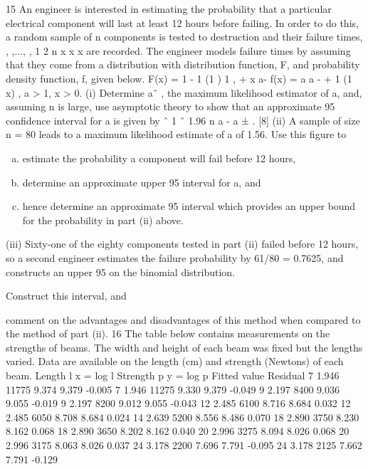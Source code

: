 \documentclass[a4paper,12pt]{article}
\begin{document}
15 An engineer is interested in estimating the probability that a particular
electrical component will last at least 12 hours before failing. In order to do
this, a random sample of n components is tested to destruction and their
failure times, , ,..., , 1 2 n x x x are recorded. The engineer models failure times by
assuming that they come from a distribution with distribution function, F, and
probability density function, f, given below.
F(x) = 1 - 1
(1 ) 1
,
+ x a- f(x) = a
a
-
+
1
(1 x)
, a > 1, x > 0.
(i) Determine aˆ , the maximum likelihood estimator of a, and, assuming n
is large, use asymptotic theory to show that an approximate 95%
confidence interval for a is given by
ˆ 1 ˆ 1.96
n
a -
a ± . [8]
(ii) A sample of size n = 80 leads to a maximum likelihood estimate of a of
1.56. Use this figure to
\begin{enumerate}[(a)]
\item estimate the probability a component will fail before 12 hours,
\item determine an approximate upper 95%
interval for a, and
\item hence determine an approximate 95%
interval which provides an upper bound for the probability in
part (ii) above. 
\end{enumerate}
(iii) Sixty-one of the eighty components tested in part (ii) failed before 12
hours, so a second engineer estimates the failure probability by
61/80 = 0.7625, and constructs an upper 95%
on the binomial distribution.
\item Construct this interval, and
\item comment on the advantages and disadvantages of this method
when compared to the method of part (ii). 
16 The table below contains measurements on the strengths of beams. The width
and height of each beam was fixed but the lengths varied. Data are available
on the length (cm) and strength (Newtons) of each beam.
Length l x = log l Strength
p
y = log p Fitted value Residual
7 1.946 11775 9.374 9.379 -0.005
7 1.946 11275 9.330 9.379 -0.049
9 2.197 8400 9.036 9.055 -0.019
9 2.197 8200 9.012 9.055 -0.043
12 2.485 6100 8.716 8.684 0.032
12 2.485 6050 8.708 8.684 0.024
14 2.639 5200 8.556 8.486 0.070
18 2.890 3750 8.230 8.162 0.068
18 2.890 3650 8.202 8.162 0.040
20 2.996 3275 8.094 8.026 0.068
20 2.996 3175 8.063 8.026 0.037
24 3.178 2200 7.696 7.791 -0.095
24 3.178 2125 7.662 7.791 -0.129
\end{document}
